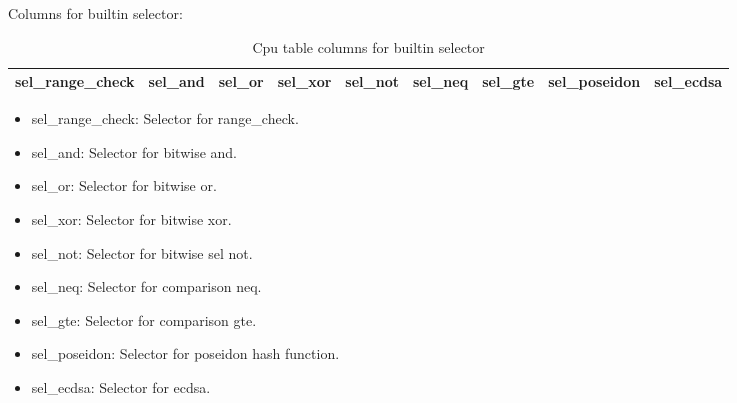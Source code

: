 Columns for builtin selector:
\begin{table}[!ht]
    \centering
    \begin{tabular}{|c|c|c|c|c|c|c|c|c|}
        \hline
        sel\_range\_check & sel\_and & sel\_or & sel\_xor & sel\_not & sel\_neq & sel\_gte & sel\_poseidon & sel\_ecdsa \\
        \hline
    \end{tabular}
    \caption{Cpu table columns for builtin selector}
    \label{table:cpu-columns-builtin-selector}
\end{table}

\begin{itemize}
    \item sel\_range\_check: Selector for range\_check.
    \item sel\_and: Selector for bitwise and.
    \item sel\_or: Selector for bitwise or.
    \item sel\_xor: Selector for bitwise xor.
    \item sel\_not: Selector for bitwise sel not.
    \item sel\_neq: Selector for comparison neq.
    \item sel\_gte: Selector for comparison gte.
    \item sel\_poseidon: Selector for poseidon hash function.
    \item sel\_ecdsa: Selector for ecdsa.
\end{itemize}